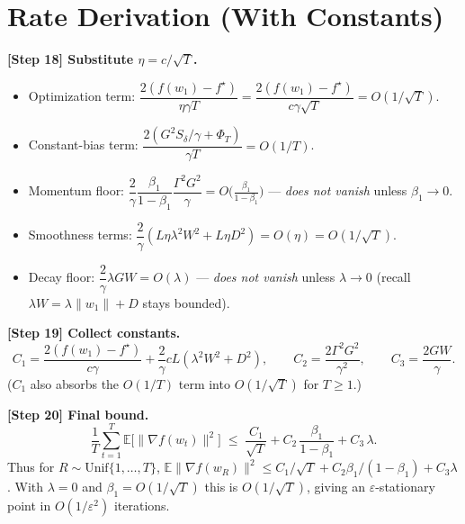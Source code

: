 \documentclass[11pt]{article}
\begin{document}
\section*{Rate Derivation (With Constants)}
\noindent\textbf{[Step 18] Substitute $\eta=c/\sqrt T$.}
\begin{itemize}
\item Optimization term: $\dfrac{2(f(w_1)-f^\star)}{\eta\gamma T}
=\dfrac{2(f(w_1)-f^\star)}{c\gamma\sqrt T}=O(1/\sqrt T)$.
\item Constant-bias term: $\dfrac{2(G^2S_\delta/\gamma+\Phi_T)}{\gamma T}=O(1/T)$.
\item Momentum floor: $\dfrac{2}{\gamma}\dfrac{\beta_1}{1-\beta_1}\dfrac{\Gamma^2G^2}{\gamma}
=O\!\big(\tfrac{\beta_1}{1-\beta_1}\big)$ — \emph{does not vanish} unless
$\beta_1\to0$.
\item Smoothness terms: $\dfrac{2}{\gamma}(L\eta\lambda^2W^2+L\eta D^2)=O(\eta)=O(1/\sqrt T)$.
\item Decay floor: $\dfrac{2}{\gamma}\lambda G W=O(\lambda)$ — \emph{does not vanish}
unless $\lambda\to0$ (recall $\lambda W=\lambda\|w_1\|+D$ stays bounded).
\end{itemize}

\noindent\textbf{[Step 19] Collect constants.}
\[
C_1=\frac{2(f(w_1)-f^\star)}{c\gamma}
+\frac{2}{\gamma}cL(\lambda^2W^2+D^2),
\qquad
C_2=\frac{2\Gamma^2G^2}{\gamma^2},
\qquad
C_3=\frac{2GW}{\gamma}.
\]
($C_1$ also absorbs the $O(1/T)$ term into $O(1/\sqrt T)$ for $T\ge1$.)

\noindent\textbf{[Step 20] Final bound.}
\[
\boxed{\;
\frac{1}{T}\sum_{t=1}^{T}\mathbb{E}\big[\|\nabla f(w_t)\|^2\big]
\;\le\;
\frac{C_1}{\sqrt T}
+C_2\,\frac{\beta_1}{1-\beta_1}
+C_3\,\lambda .
\;}
\]
Thus for $R\sim\mathrm{Unif}\{1,\dots,T\}$,
$\mathbb{E}\|\nabla f(w_R)\|^2 \le C_1/\sqrt T+C_2\beta_1/(1-\beta_1)+C_3\lambda$.
With $\lambda=0$ and $\beta_1=O(1/\sqrt T)$ this is $O(1/\sqrt T)$, giving an
$\varepsilon$-stationary point in $O(1/\varepsilon^2)$ iterations.

\end{document}
